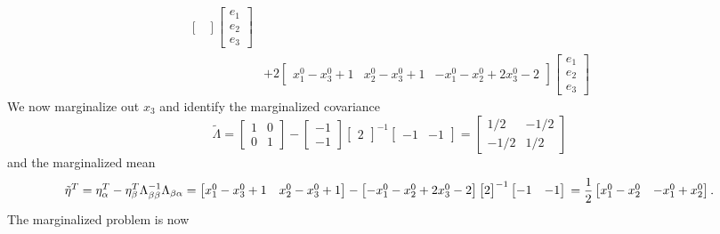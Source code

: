 $$\begin{aligned}
\begin{bmatrix}
  \end{bmatrix} \begin{bmatrix}
    e_1 \\ e_2 \\ e_3
  \end{bmatrix} \\
  & + 2 \begin{bmatrix}
    x_1^0 - x_3^0 +1 & x_2^0 - x_3^0 + 1 & -x_1^0 - x_2^0 + 2 x_3^0 -2
  \end{bmatrix} \begin{bmatrix}
    e_1 \\ e_2 \\ e_3
  \end{bmatrix}
\end{aligned}
$$
We now marginalize out $x_3$ and identify the marginalized covariance
$$
  \tilde \Lambda = \begin{bmatrix}
    1 & 0 \\ 0 & 1
  \end{bmatrix} - \begin{bmatrix}
    -1 \\ -1
  \end{bmatrix} \begin{bmatrix}
    2
  \end{bmatrix}^{-1} \begin{bmatrix}
    -1 & -1
  \end{bmatrix} = \begin{bmatrix}
    1/2 & -1/2 \\ -1/2 & 1/2
  \end{bmatrix}
$$
and the marginalized mean
$$
  \tilde \eta^T = \eta_{\alpha}^T - \eta_\beta^T \Lambda_{\beta \beta}^{-1} \Lambda_{\beta \alpha} = \begin{bmatrix}
    x_1^0 - x_3^0 +1 & x_2^0 - x_3^0 + 1
  \end{bmatrix} - \begin{bmatrix} -x_1^0 - x_2^0 + 2 x_3^0 -2\end{bmatrix} \begin{bmatrix}
    2
  \end{bmatrix}^{-1} \begin{bmatrix}
    -1 & -1
  \end{bmatrix} \\
  = \frac{1}{2}\begin{bmatrix}
    x_1^0 - x_2^0 & -x_1^0 + x_2^0
  \end{bmatrix}.
$$
The marginalized problem is now
